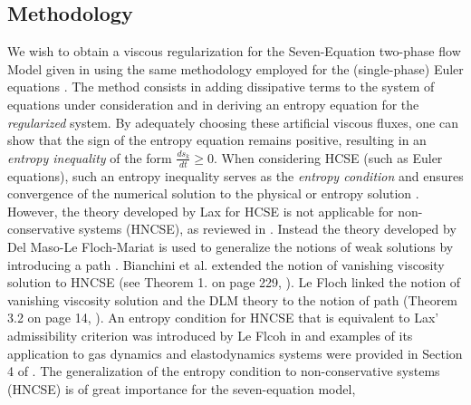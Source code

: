 \subsection{Methodology}
%
We wish to obtain a viscous regularization for the Seven-Equation two-phase flow Model given in  using the same methodology 
employed for the (single-phase) Euler equations \cite{jlg_VR_SIAM_2004,Marco_paper_low_mach}. The method consists in adding dissipative terms to the system of equations under 
consideration and in deriving an entropy equation for the {\it regularized} system. By adequately choosing these artificial viscous fluxes, one can 
show that the sign of the entropy equation remains positive, resulting in an \emph{entropy inequality} of the form $\frac{d s_k}{dt} \geq 0$. When considering 
HCSE (such as Euler equations), such an entropy inequality serves as the \emph{entropy condition} and ensures convergence of the numerical solution to
the physical or entropy solution \cite{Lax}. However, the theory developed by Lax for HCSE \cite{Lax} is not applicable for non-conservative systems (HNCSE), as reviewed in .
Instead the theory developed by Del Maso-Le Floch-Mariat is used to generalize the notions of weak solutions by introducing a path 
 \cite{dlm}. 
Bianchini et al. extended the notion of vanishing viscosity solution to HNCSE (see Theorem 1. on page 229,  \cite{bianchini_bressan_2005}). 
Le Floch linked the notion of vanishing viscosity solution and the DLM theory to the notion of path (Theorem 3.2 on page 14, \cite{lefloch_1989}). 
An entropy condition for HNCSE that is equivalent to Lax' admissibility criterion was introduced by Le Flcoh in \cite{lefloch_1988} and 
examples of its application to gas dynamics and elastodynamics systems were provided in Section 4 of \cite{lefloch_1988}. 
The generalization of the entropy condition to non-conservative systems (HNCSE) is of great importance for the seven-equation model,
